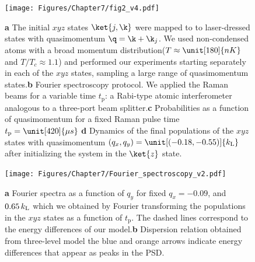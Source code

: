 %
%
\begin{figure}[htb]
\begin{center}
\texttt{[image: Figures/Chapter7/fig2\_v4.pdf]}
\caption{{\bfseries a} The initial $xyz$ states $\ket{j,\k}$ were mapped to to laser-dressed states with quasimomentum $\q=\k+\k_j$. We used non-condensed atoms with a broad momentum distribution($T\approx\unit[180]{nK}$ and $T/T_c\approx 1.1$) and performed our experiments starting separately in each of the $xyz$ states, sampling a large range of quasimomentum states.{\bfseries b} Fourier spectroscopy protocol. We applied the Raman beams for a variable time $t_{\mathrm{p}}$: a Rabi-type atomic interferometer analogous to a three-port beam splitter.{\bfseries c} Probabilities as a function of quasimomentum for a fixed Raman pulse time $t_{\rm p}=\unit[420]{\mu s}$ {\bfseries d} Dynamics of the final populations of the $xyz$ states with quasimomentum $(q_x, q_y)=\unit[(-0.18, -0.55)]{k_{\rm L}}$ after initializing the system in the $\ket{z}$ state.}
\label{fig:fourier_spectroscopy}
\end{center}
\end{figure}
\begin{figure}[htb]
\begin{center}
\texttt{[image: Figures/Chapter7/Fourier\_spectroscopy\_v2.pdf]}
\caption{{\bfseries a} Fourier spectra as a function of $q_y$ for fixed $q_x=-0.09$, and $0.65\,k_{\rm L}$ which we obtained by Fourier transforming the populations in the $xyz$ states as a function of $t_{\mathrm{p}}$. The dashed lines correspond to the energy differences of our model.{\bfseries b} Dispersion relation obtained from three-level model the blue and orange arrows indicate energy differences that appear as peaks in the PSD.}
\label{fig:fourier_spectroscopy_bands}
\end{center}
\end{figure}
